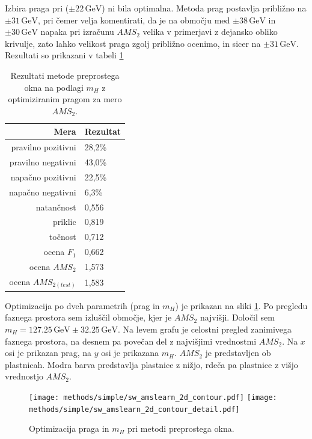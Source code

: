 \documentclass[11pt,a4paper,openany]{book}
\begin{document}
Izbira praga pri ($\pm 22\,\text{GeV}$) ni bila optimalna. Metoda prag postavlja približno na $\pm 31\,\text{GeV}$, pri čemer velja komentirati, da je na območju med $\pm 38\,\text{GeV}$ in $\pm 30\,\text{GeV}$ napaka pri izračunu $AMS_2$ velika v primerjavi z dejansko obliko krivulje, zato lahko velikost praga zgolj približno ocenimo, in sicer na $\pm 31\,\text{GeV}$. Rezultati so prikazani v tabeli \ref{tb:preprosto_okno_optimized}

\begin{table}[ht]
	\centering
	\begin{tabular}{rl}
		\hline
		\textbf{Mera} & \textbf{Rezultat} \\
		\hline
		pravilno pozitivni & 28,2\%\\
		pravilno negativni & 43,0\% \\
		napačno pozitivni & 22,5\% \\
		napačno negativni & 6,3\% \\
		natančnost & 0,556 \\
		priklic & 0,819 \\
		točnost & 0,712 \\
		ocena $F_1$ & 0,662 \\
		ocena $AMS_2$ & 1,573 \\
		ocena $AMS_{2(test)}$ & 1,583 		
	\end{tabular}
	\caption{Rezultati metode preprostega okna na podlagi $m_H$ z optimiziranim pragom za mero $AMS_2$.}
	\label{tb:preprosto_okno_optimized}
\end{table}

Optimizacija po dveh parametrih (prag in $m_H$) je prikazan na sliki \ref{sl:simple_optimization_2d}. Po pregledu faznega prostora sem izluščil območje, kjer je $AMS_2$ najvišji. Določil sem $m_H = \num{127,25}\,\text{GeV} \pm \num{32,25}\,\text{GeV}$. Na levem grafu je celostni pregled zanimivega faznega prostora, na desnem pa povečan del z najvišjimi vrednostmi $AMS_2$. Na $x$ osi je prikazan prag, na $y$ osi je prikazana $m_H$. $AMS_2$ je predstavljen ob plastnicah. Modra barva predstavlja plastnice z nižjo, rdeča pa plastnice z višjo vrednostjo $AMS_2$.

\begin{figure}[h]
	\centering	
	\texttt{[image: methods/simple/sw\_amslearn\_2d\_contour.pdf]}
	\texttt{[image: methods/simple/sw\_amslearn\_2d\_contour\_detail.pdf]}		
	
	\caption{Optimizacija praga in $m_H$ pri metodi preprostega okna.}
	\label{sl:simple_optimization_2d}
\end{figure}
\end{document}
